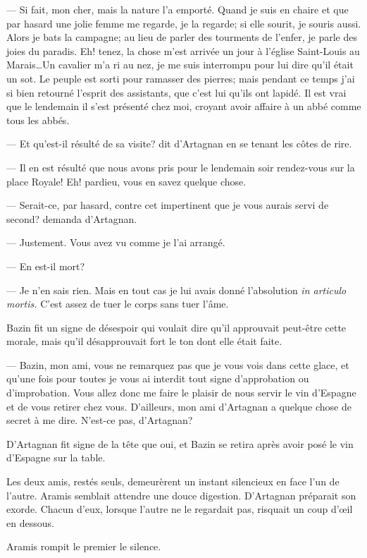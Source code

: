 — Si fait, mon cher, mais la nature l'a emporté. Quand je suis en chaire et que par hasard une jolie femme me regarde, je la regarde; si elle sourit, je souris aussi. Alors je bats la campagne; au lieu de parler des tourments de l'enfer, je parle des joies du paradis. Eh! tenez, la chose m'est arrivée un jour à l'église Saint-Louis au Marais\dots Un cavalier m'a ri au nez, je me suis interrompu pour lui dire qu'il était un sot. Le peuple est sorti pour ramasser des pierres; mais pendant ce temps j'ai si bien retourné l'esprit des assistants, que c'est lui qu'ils ont lapidé. Il est vrai que le lendemain il s'est présenté chez moi, croyant avoir affaire à un abbé comme tous les abbés.

— Et qu'est-il résulté de sa visite? dit d'Artagnan en se tenant les côtes de rire.

— Il en est résulté que nous avons pris pour le lendemain soir rendez-vous sur la place Royale! Eh! pardieu, vous en savez quelque chose.

— Serait-ce, par hasard, contre cet impertinent que je vous aurais servi de second? demanda d'Artagnan.

— Justement. Vous avez vu comme je l'ai arrangé.

— En est-il mort?

— Je n'en sais rien. Mais en tout cas je lui avais donné l'absolution \textit{in articulo mortis.} C'est assez de tuer le corps sans tuer l'âme.

Bazin fit un signe de désespoir qui voulait dire qu'il approuvait peut-être cette morale, mais qu'il désapprouvait fort le ton dont elle était faite.

— Bazin, mon ami, vous ne remarquez pas que je vous vois dans cette glace, et qu'une fois pour toutes je vous ai interdit tout signe d'approbation ou d'improbation. Vous allez donc me faire le plaisir de nous servir le vin d'Espagne et de vous retirer chez vous. D'ailleurs, mon ami d'Artagnan a quelque chose de secret à me dire. N'est-ce pas, d'Artagnan?

D'Artagnan fit signe de la tête que oui, et Bazin se retira après avoir posé le vin d'Espagne sur la table.

Les deux amis, restés seuls, demeurèrent un instant silencieux en face l'un de l'autre. Aramis semblait attendre une douce digestion. D'Artagnan préparait son exorde. Chacun d'eux, lorsque l'autre ne le regardait pas, risquait un coup d'œil en dessous.

Aramis rompit le premier le silence.
